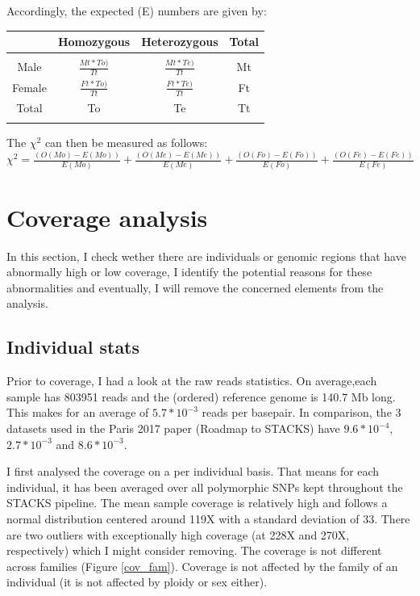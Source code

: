 \documentclass[10pt,a4paper]{report}
\begin{document}
Accordingly, the expected  (E) numbers are given by:

\begin{table}[h!]
\begin{tabular}{c|c c c}
& Homozygous & Heterozygous & Total\\[5px]
\hline\\[5px]
Male & $\frac{Mt*To)}{Tt}$ & $\frac{Mt*Te)}{Tt}$ & Mt\\[5px]
Female & $\frac{Ft*To)}{Tt}$ & $\frac{Ft*Te)}{Tt}$ & Ft\\[5px]
Total & To & Te & Tt\\
\vspace{5px}
\end{tabular}
\end{table}

The $\chi^2$ can then be measured as follows:\\
$\chi^2= \frac{(O(Mo)-E(Mo))}{E(Mo)} + \frac{(O(Me)-E(Me))}{E(Me)} + \frac{(O(Fo)-E(Fo))}{E(Fo)} + \frac{(O(Fe)-E(Fe))}{E(Fe)}$

\chapter{Coverage analysis}

In this section, I check wether there are individuals or genomic regions that have abnormally high or low coverage, I identify the potential reasons for these abnormalities and eventually, I will remove the concerned elements from the analysis.

\section{Individual stats}

Prior to coverage, I had a look at the raw reads statistics. On average,each sample has 803951 reads and the (ordered) reference genome is 140.7 Mb long. This makes for an average of $5.7*10^{-3}$ reads per basepair.
In comparison, the 3 datasets used in the Paris 2017 paper (Roadmap to STACKS) have $9.6*10^{-4}$, $2.7*10^{-3}$ and $8.6*10^{-3}$.

I first analysed the coverage on a per individual basis. That means for each individual, it has been averaged over all polymorphic SNPs kept throughout the STACKS pipeline. The mean sample coverage is relatively high and follows a normal distribution centered around 119X with a standard deviation of 33. There are two outliers with exceptionally high coverage (at 228X and 270X, respectively) which I might consider removing. The coverage is not different across families (Figure \ref{cov_fam}). Coverage is not affected by the family of an individual (it is not affected by ploidy or sex either).
\end{document}
